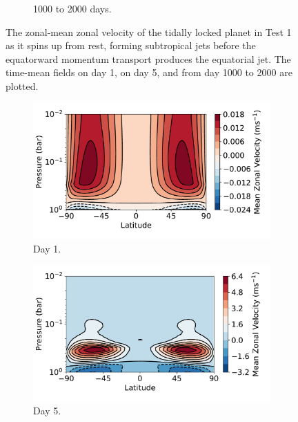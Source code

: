 \begin{figure}
\begin{subfigure}[t]{0.31\textwidth}
    \caption{1000 to 2000 days.}
  \end{subfigure}
  \caption{The zonal-mean zonal velocity of the tidally locked planet in Test 1 as it spins up from rest, forming subtropical jets before the equatorward momentum transport produces the equatorial jet. The time-mean fields on day 1, on day 5, and from day 1000 to 2000 are plotted.}\label{fig:test-1-spinup}
\end{figure}


\begin{figure}
  \centering
  \begin{subfigure}[t]{0.31\textwidth}
    \includegraphics[width=\textwidth]{figures/eqm-zonal-flow/zonal-wind-axi-day1.pdf}
    \caption{Day 1.}
  \end{subfigure}
\enskip
  \begin{subfigure}[t]{0.31\textwidth}
    \includegraphics[width=\textwidth]{figures/eqm-zonal-flow/axi-zonal-u-5day.pdf}
    \caption{Day 5.}
  \end{subfigure}
\enskip
  \begin{subfigure}[t]{0.31\textwidth}

\end{subfigure}
\end{figure}
